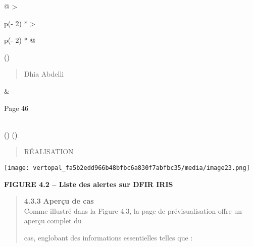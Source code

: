\documentclass[
]{article}
\begin{document}
\begin{longtable}[]{@{}
  >{\raggedright\arraybackslash}p{(\columnwidth - 2\tabcolsep) * }
  >{\raggedright\arraybackslash}p{(\columnwidth - 2\tabcolsep) * }@{}}
\toprule()
\begin{minipage}[b]{\linewidth}\raggedright
\begin{quote}
Dhia Abdelli
\end{quote}
\end{minipage} & \begin{minipage}[b]{\linewidth}\raggedright
Page 46
\end{minipage} \\
\midrule()
\endhead
\bottomrule()
\end{longtable}

\begin{quote}
RÉALISATION
\end{quote}

\texttt{[image: vertopal\_fa5b2edd966b48bfbc6a830f7abfbc35/media/image23.png]}

\textbf{FIGURE 4.2 -- Liste des alertes sur DFIR IRIS}

\begin{quote}
\textbf{4.3.3} \textbf{Aperçu de cas}\\
Comme illustré dans la Figure 4.3, la page de prévisualisation offre un
aperçu complet du

cas, englobant des informations essentielles telles que :
\end{quote}
\end{document}

